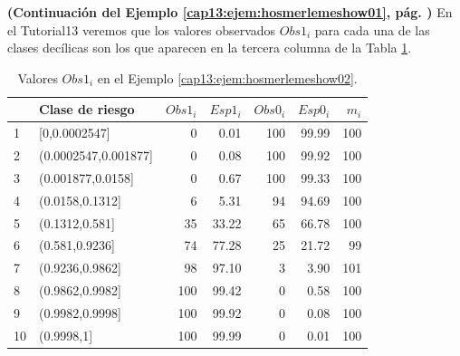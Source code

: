 \begin{enumerate}
    \begin{ejemplo}
    \label{cap13:ejem:hosmerlemeshow02}
    {\bf (Continuación del Ejemplo \ref{cap13:ejem:hosmerlemeshow01}, pág. \pageref{cap13:ejem:hosmerlemeshow01})}
    En el Tutorial13 veremos que los valores observados $Obs1_i$ para cada una de las clases decílicas son los que aparecen en la tercera columna de la Tabla \ref{cap13:tabla:hosmerlemeshow02}.
    \begin{table}[ht]
    \begin{center}
    \begin{tabular}{llrrrrr}
      \hline
     & Clase de riesgo & $Obs1_i$ & $Esp1_i$ & $Obs0_i$ & $Esp0_i$ & $m_i$ \\
      \hline
      1 & [0,0.0002547] &   0 & 0.01 & 100 & 99.99 & 100 \\
      2 & (0.0002547,0.001877] &   0 & 0.08 & 100 & 99.92 & 100 \\
      3 & (0.001877,0.0158] &   0 & 0.67 & 100 & 99.33 & 100 \\
      4 & (0.0158,0.1312] &   6 & 5.31 &  94 & 94.69 & 100 \\
      5 & (0.1312,0.581] &  35 & 33.22 &  65 & 66.78 & 100 \\
      6 & (0.581,0.9236] &  74 & 77.28 &  25 & 21.72 &  99 \\
      7 & (0.9236,0.9862] &  98 & 97.10 &   3 & 3.90 & 101 \\
      8 & (0.9862,0.9982] & 100 & 99.42 &   0 & 0.58 & 100 \\
      9 & (0.9982,0.9998] & 100 & 99.92 &   0 & 0.08 & 100 \\
      10 & (0.9998,1] & 100 & 99.99 &   0 & 0.01 & 100 \\
       \hline
    \end{tabular}
    \end{center}
    \caption{Valores $Obs1_i$ en el Ejemplo \ref{cap13:ejem:hosmerlemeshow02}.}
    \label{cap13:tabla:hosmerlemeshow02}
    \end{table}

\end{ejemplo}


\end{enumerate}
